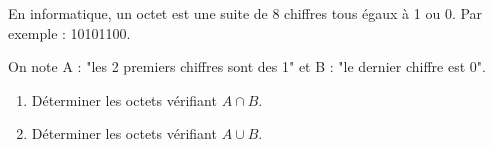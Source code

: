 
En informatique, un octet est une suite de 8 chiffres tous égaux à 1 ou 0. Par exemple : 10101100.

On note A : "les 2 premiers chiffres sont des 1" et B : "le dernier chiffre est 0".
\begin{enumerate}
\item Déterminer les octets vérifiant $A\cap B$.
\item  Déterminer les octets vérifiant $A\cup B$.
\end{enumerate}